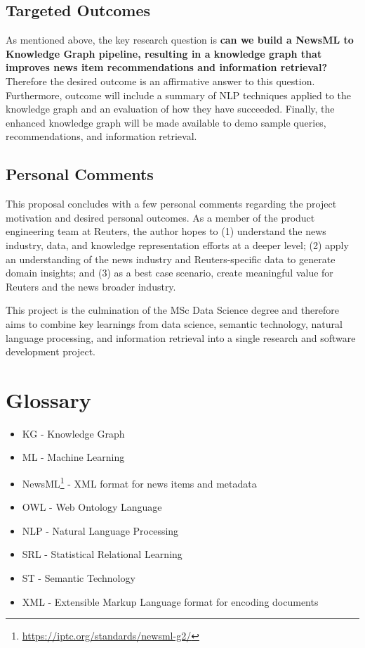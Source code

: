 \documentclass[11pt]{article}   	%
\begin{document}
\subsection{Targeted Outcomes}

As mentioned above, the key research question is \textbf{can we build a NewsML to Knowledge Graph pipeline, resulting in a knowledge graph that improves news item recommendations and information retrieval?} Therefore the desired outcome is an affirmative answer to this question. Furthermore, outcome will include a summary of NLP techniques applied to the knowledge graph and an evaluation of how they have succeeded. Finally, the enhanced knowledge graph will be made available to demo sample queries, recommendations, and information retrieval.

\subsection{Personal Comments}

This proposal concludes with a few personal comments regarding the project motivation and desired personal outcomes. As a member of the product engineering team at Reuters, the author hopes to (1) understand the news industry, data, and knowledge representation efforts at a deeper level; (2) apply an understanding of the news industry and Reuters-specific data to generate domain insights; and (3) as a best case scenario, create meaningful value for Reuters and the news broader industry.

This project is the culmination of the MSc Data Science degree and therefore aims to combine key learnings from data science, semantic technology, natural language processing, and information retrieval into a single research and software development project.

\newpage
\section{Glossary}
\begin{itemize}
\item KG - Knowledge Graph
\item ML - Machine Learning
\item NewsML\footnote{\url{https://iptc.org/standards/newsml-g2/}} - XML format for news items and metadata
\item OWL - Web Ontology Language
\item NLP - Natural Language Processing
\item SRL - Statistical Relational Learning
\item ST - Semantic Technology
\item XML - Extensible Markup Language format for encoding documents
\end{itemize}

\newpage


\end{document}
